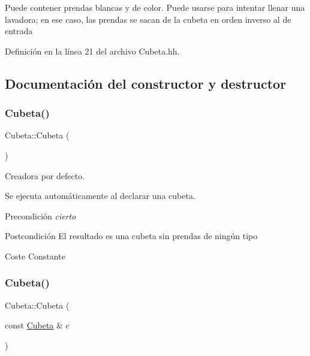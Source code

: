 Puede contener prendas blancas y de color. Puede usarse para intentar llenar una lavadora; en ese caso, las prendas se sacan de la cubeta en orden inverso al de entrada 

Definición en la línea 21 del archivo Cubeta.\+hh.



\subsection{Documentación del constructor y destructor}
\mbox{\label{class_cubeta_ae85e70c9cd67454446439891e3f435e1}} 
\subsubsection{\texorpdfstring{Cubeta()}{Cubeta()}\hspace{0.1cm}{\footnotesize\ttfamily [1/2]}}
{\footnotesize\ttfamily Cubeta\+::\+Cubeta (\begin{DoxyParamCaption}{ }\end{DoxyParamCaption})}



Creadora por defecto. 

Se ejecuta automáticamente al declarar una cubeta. \begin{DoxyPrecond}{Precondición}
{\itshape cierto} 
\end{DoxyPrecond}
\begin{DoxyPostcond}{Postcondición}
El resultado es una cubeta sin prendas de ningún tipo 
\end{DoxyPostcond}
\begin{DoxyParagraph}{Coste}
Constante 
\end{DoxyParagraph}
\mbox{\label{class_cubeta_a9615e48038899c5732f61661585f12c7}} 
\subsubsection{\texorpdfstring{Cubeta()}{Cubeta()}\hspace{0.1cm}{\footnotesize\ttfamily [2/2]}}
{\footnotesize\ttfamily Cubeta\+::\+Cubeta (\begin{DoxyParamCaption}\item[{const \hyperlink{class_cubeta}{Cubeta} \&}]{c }\end{DoxyParamCaption})}




